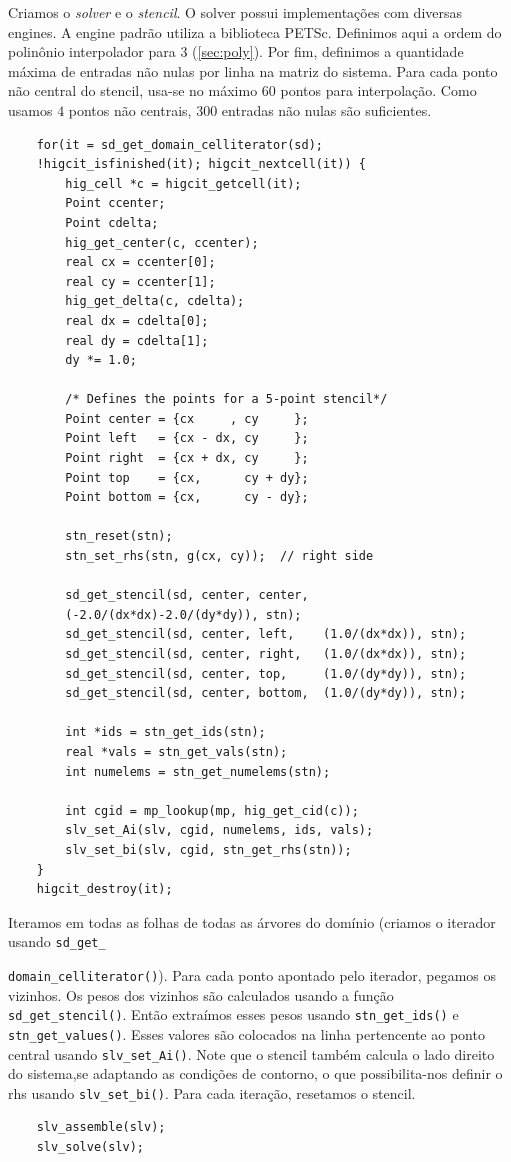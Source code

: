 Criamos o \textit{solver} e o \textit{stencil}. O solver possui implementações com diversas engines. A engine padrão utiliza a biblioteca PETSc. Definimos aqui a ordem do polinônio interpolador para $3$ (\ref{sec:poly}). Por fim, definimos a quantidade máxima de entradas não nulas por linha na matriz do sistema. Para cada ponto não central do stencil, usa-se no máximo $60$ pontos para interpolação. Como usamos $4$ pontos não centrais, $300$ entradas não nulas são suficientes.

\begin{verbatim}
	for(it = sd_get_domain_celliterator(sd); 
	!higcit_isfinished(it); higcit_nextcell(it)) {
        hig_cell *c = higcit_getcell(it);
        Point ccenter;
        Point cdelta;
        hig_get_center(c, ccenter);
        real cx = ccenter[0];
        real cy = ccenter[1];
        hig_get_delta(c, cdelta);
        real dx = cdelta[0];
        real dy = cdelta[1];
        dy *= 1.0;

        /* Defines the points for a 5-point stencil*/
        Point center = {cx     , cy     };
        Point left   = {cx - dx, cy     };
        Point right  = {cx + dx, cy     };
        Point top    = {cx,      cy + dy};
        Point bottom = {cx,      cy - dy};

        stn_reset(stn);
        stn_set_rhs(stn, g(cx, cy));  // right side
        
        sd_get_stencil(sd, center, center, 
		(-2.0/(dx*dx)-2.0/(dy*dy)), stn);
        sd_get_stencil(sd, center, left,    (1.0/(dx*dx)), stn);
        sd_get_stencil(sd, center, right,   (1.0/(dx*dx)), stn);
        sd_get_stencil(sd, center, top,     (1.0/(dy*dy)), stn);
        sd_get_stencil(sd, center, bottom,  (1.0/(dy*dy)), stn); 

        int *ids = stn_get_ids(stn);
        real *vals = stn_get_vals(stn);
        int numelems = stn_get_numelems(stn);

        int cgid = mp_lookup(mp, hig_get_cid(c));
        slv_set_Ai(slv, cgid, numelems, ids, vals);
        slv_set_bi(slv, cgid, stn_get_rhs(stn));
    }
	higcit_destroy(it);
\end{verbatim}

Iteramos em todas as folhas de todas as árvores do domínio (criamos o iterador usando \texttt{sd\_get\_}

\texttt{domain\_celliterator()}). Para cada ponto apontado pelo iterador, pegamos os vizinhos. Os pesos dos vizinhos são calculados usando a função \texttt{sd\_get\_stencil()}. Então extraímos esses pesos usando \texttt{stn\_get\_ids()} e \texttt{stn\_get\_values()}. Esses valores são colocados na linha pertencente ao ponto central usando \texttt{slv\_set\_Ai()}. Note que o stencil também calcula o lado direito do sistema,se adaptando as condições de contorno, o que possibilita-nos definir o rhs usando \texttt{slv\_set\_bi()}. Para cada iteração, resetamos o stencil.
\begin{verbatim}
	slv_assemble(slv);
	slv_solve(slv);
\end{verbatim}

